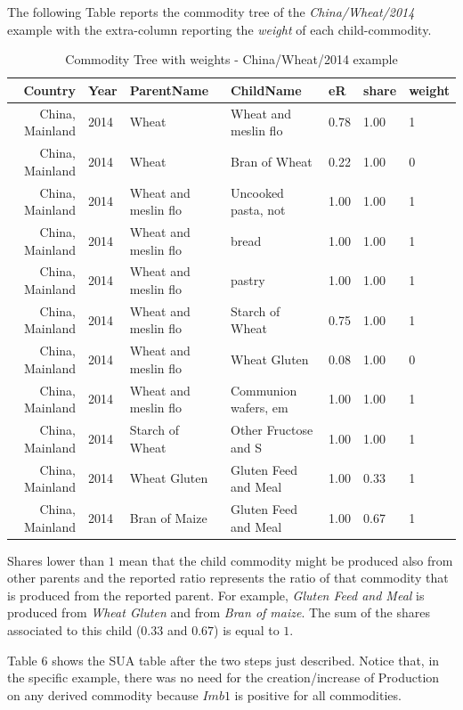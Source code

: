\documentclass[]{article}
\begin{document}
The following Table reports the commodity tree of the
\emph{China/Wheat/2014} example with the extra-column reporting the
\emph{weight} of each child-commodity.

\begin{table}

\caption{\label{tab:t4}Commodity Tree  with weights - China/Wheat/2014 example}
\centering
\begin{tabular}[t]{r|l|l|l|l|l|l}
\hline
Country & Year & ParentName & ChildName & eR & share & weight\\
\hline
China, Mainland & 2014 & Wheat & Wheat and meslin flo & 0.78 & 1.00 & 1\\
\hline
China, Mainland & 2014 & Wheat & Bran of Wheat & 0.22 & 1.00 & 0\\
\hline
China, Mainland & 2014 & Wheat and meslin flo & Uncooked pasta, not & 1.00 & 1.00 & 1\\
\hline
China, Mainland & 2014 & Wheat and meslin flo & bread & 1.00 & 1.00 & 1\\
\hline
China, Mainland & 2014 & Wheat and meslin flo & pastry & 1.00 & 1.00 & 1\\
\hline
China, Mainland & 2014 & Wheat and meslin flo & Starch of Wheat & 0.75 & 1.00 & 1\\
\hline
China, Mainland & 2014 & Wheat and meslin flo & Wheat Gluten & 0.08 & 1.00 & 0\\
\hline
China, Mainland & 2014 & Wheat and meslin flo & Communion wafers, em & 1.00 & 1.00 & 1\\
\hline
China, Mainland & 2014 & Starch of Wheat & Other Fructose and S & 1.00 & 1.00 & 1\\
\hline
China, Mainland & 2014 & Wheat Gluten & Gluten Feed and Meal & 1.00 & 0.33 & 1\\
\hline
China, Mainland & 2014 & Bran of Maize & Gluten Feed and Meal & 1.00 & 0.67 & 1\\
\hline
\end{tabular}
\end{table}

Shares lower than \(1\) mean that the child commodity might be produced
also from other parents and the reported ratio represents the ratio of
that commodity that is produced from the reported parent. For example,
\emph{Gluten Feed and Meal} is produced from \emph{Wheat Gluten} and
from \emph{Bran of maize}. The sum of the shares associated to this
child (\(0.33\) and \(0.67\)) is equal to \(1\).

Table 6 shows the SUA table after the two steps just described. Notice
that, in the specific example, there was no need for the
creation/increase of Production on any derived commodity because
\(Imb1\) is positive for all commodities.
\end{document}
